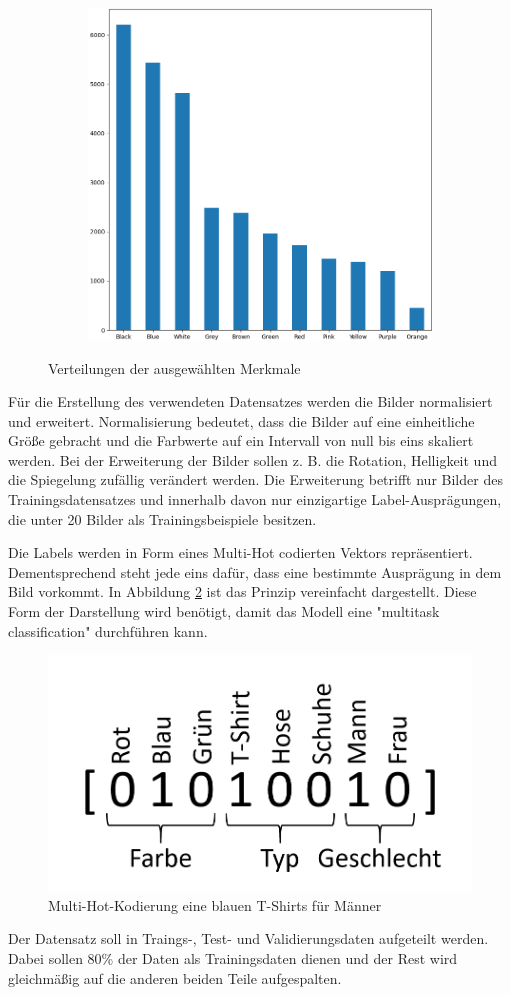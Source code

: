 \begin{figure}[H]
\begin{subfigure}[c]{0.32\linewidth}
	\end{subfigure}
	\begin{subfigure}[c]{0.32\linewidth}
		\includegraphics[width=\linewidth]{images/baseColour.png}
	\end{subfigure}
	\caption{Verteilungen der ausgewählten Merkmale}
	\label{fig:evaluation}
\end{figure}

Für die Erstellung des verwendeten Datensatzes werden die Bilder normalisiert und erweitert. Normalisierung bedeutet, dass die Bilder auf eine einheitliche Größe gebracht und die Farbwerte auf ein Intervall von null bis eins skaliert werden. Bei der Erweiterung der Bilder sollen z. B. die Rotation, Helligkeit und die Spiegelung zufällig verändert werden. Die Erweiterung betrifft nur Bilder des Trainingsdatensatzes und innerhalb davon nur einzigartige Label-Ausprägungen, die unter 20 Bilder als Trainingsbeispiele besitzen.

Die Labels werden in Form eines Multi-Hot codierten Vektors repräsentiert. Dementsprechend steht jede eins dafür, dass eine bestimmte Ausprägung in dem Bild vorkommt. In Abbildung \ref{fig:multihot} ist das Prinzip vereinfacht dargestellt. Diese Form der Darstellung wird benötigt, damit das Modell eine "multitask classification" durchführen kann.

\begin{figure}[H]
	\centering
	\includegraphics[width=0.3\linewidth]{images/MultiHotEncoding.png}
	\caption{Multi-Hot-Kodierung eine blauen T-Shirts für Männer}
	\label{fig:multihot}
\end{figure}

Der Datensatz soll in Traings-, Test- und Validierungsdaten aufgeteilt werden. Dabei sollen 80\% der Daten als Trainingsdaten dienen und der Rest wird gleichmäßig auf die anderen beiden Teile aufgespalten.